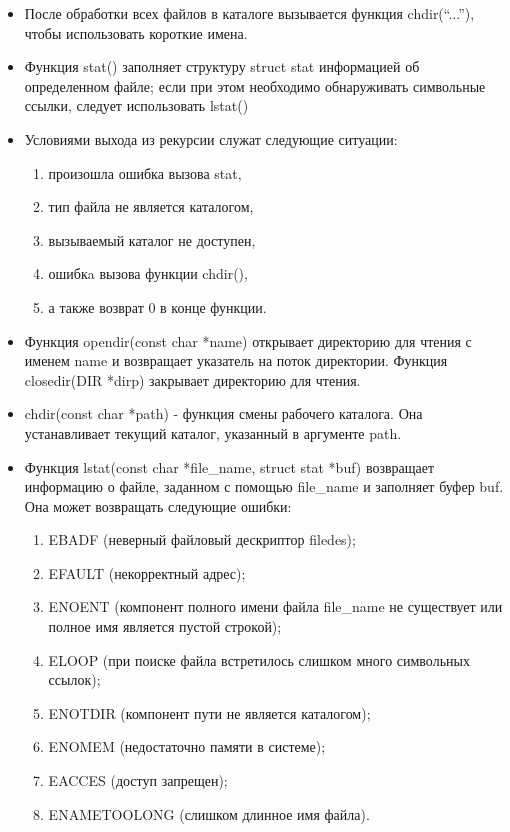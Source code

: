 \begin{itemize}
	\item После обработки всех файлов в каталоге вызывается функция chdir(“...”), чтобы использовать короткие имена.
	\item Функция stat() заполняет структуру struct stat информацией об определенном файле; если при этом необходимо обнаруживать символьные ссылки, следует использовать lstat()
	\item Условиями выхода из рекурсии служат следующие ситуации: \begin{enumerate}
	\item произошла ошибка вызова stat,\item тип файла не является каталогом,\item вызываемый
	каталог не доступен,\item ошибкa вызова функции chdir(),\item а также возврат 0 в конце функции.
\end{enumerate}
\item Функция opendir(const char *name) открывает директорию для чтения с именем
name и возвращает указатель на поток директории. Функция closedir(DIR *dirp)
закрывает директорию для чтения.
\item chdir(const char *path) - функция смены рабочего каталога. Она устанавливает
текущий каталог, указанный в аргументе path.
\item Функция lstat(const char *file\_name, struct stat *buf) возвращает информацию о
файле, заданном с помощью file\_name и заполняет буфер buf. Она может возвращать следующие ошибки:\begin{enumerate}
\item EBADF (неверный файловый дескриптор filedes);
\item EFAULT (некорректный адрес);
\item ENOENT (компонент полного имени файла file\_name не существует или полное имя является пустой строкой);

\item ELOOP (при поиске файла встретилось слишком много символьных ссылок);
\item ENOTDIR (компонент пути не является каталогом);
\item ENOMEM (недостаточно памяти в системе);
\item EACCES (доступ запрещен);

\item ENAMETOOLONG (слишком длинное имя файла).	\end{enumerate}
\end{itemize}
